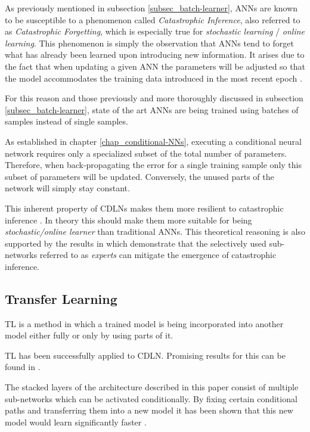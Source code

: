 As previously mentioned in subsection \ref{subsec_batch-learner}, \acp{ANN} are known to be susceptible to a phenomenon called \textit{Catastrophic Inference}, also referred to as \textit{Catastrophic Forgetting}, which is especially true for \textit{stochastic learning} / \textit{online learning}.
This phenomenon is simply the observation that \acp{ANN} tend to forget what has already been learned upon introducing new information.
It arises due to the fact that when updating a given \acs{ANN} the parameters will be adjusted so that the model accommodates the training data introduced in the most recent epoch \cite[p. 1]{20_catastrophic-inference}.

For this reason and those previously and more thoroughly discussed in subsection \ref{subsec_batch-learner}, state of the art \acp{ANN} are being trained using batches of samples instead of single samples. \linebreak

As established in chapter \ref{chap_conditional-NNs}, executing a conditional neural network requires only a specialized subset of the total number of parameters.
Therefore, when back-propagating the error for a single training sample only this subset of parameters will be updated. Conversely, the unused parts of the network will simply stay constant. 

This inherent property of \acp{CDLN} makes them more resilient to catastrophic inference \cite[p. 1]{21_conditional-channel-gated-network}.
In theory this should make them more suitable
for being \textit{stochastic/online learner} than 
traditional \acp{ANN}.
This theoretical reasoning is also supported by the results in \cite{31_continual-learning-2020} which
demonstrate that the selectively used sub-networks referred to as \textit{experts} can mitigate the
emergence of catastrophic inference.
 
 
\subsection{Transfer Learning}

\acf{TL} is a method in which a trained model
is being incorporated into another model either fully or only
by using parts of it.

\acs{TL} has been successfully applied to \acs{CDLN}.
Promising results for this can be found in  \cite{27_path-net-evolution}.

The stacked layers of the architecture described in this paper consist
of multiple sub-networks which can be activated conditionally.
By fixing certain conditional paths and transferring them 
into a new model it has been shown that this new model would 
learn significantly faster \cite[chapter 3]{27_path-net-evolution}.


